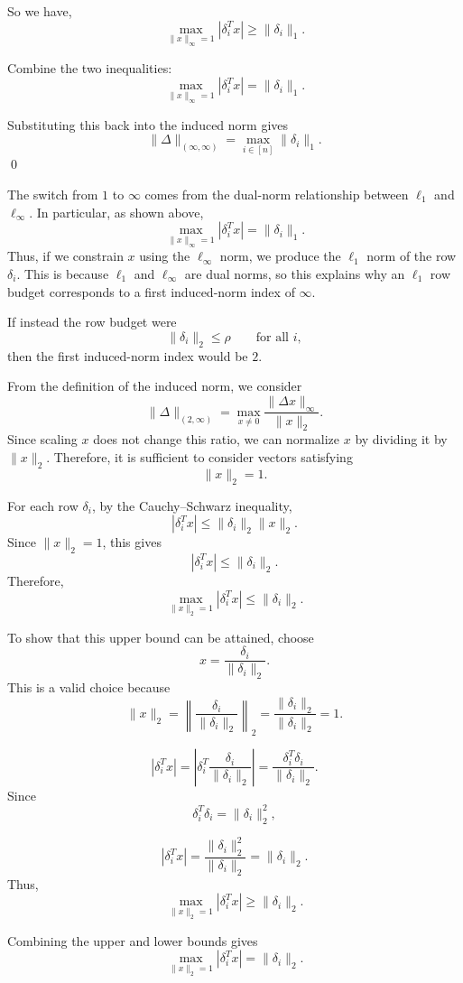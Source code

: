 \documentclass{article}
\begin{document}
So we have, 
\[
\max_{\|x\|_\infty=1}|\delta_i^T x|
\geq
\|\delta_i\|_1.
\]

Combine the two inequalities: 
\[
\max_{\|x\|_\infty=1}|\delta_i^T x|
=
\|\delta_i\|_1.
\]

Substituting this back into the induced norm gives
\[
\|\Delta\|_{(\infty,\infty)}
=
\max_{i\in[n]}\|\delta_i\|_1.
\] \qed

\vspace{5mm}

The switch from $1$ to $\infty$ comes from the dual-norm relationship
between $\ell_1$ and $\ell_\infty$. In particular, as shown above,
\[
\max_{\|x\|_\infty=1} |\delta_i^T x|
=
\|\delta_i\|_1.
\]
Thus, if we constrain $x$ using the $\ell_\infty$ norm, we produce the
$\ell_1$ norm of the row $\delta_i$. This is because $\ell_1$ and
$\ell_\infty$ are dual norms, so this explains why an $\ell_1$ row budget
corresponds to a first induced-norm index of $\infty$.

\vspace{5mm}
If instead the row budget were
\[
\|\delta_i\|_2 \leq \rho
\qquad \text{for all } i,
\]
then the first induced-norm index would be $2$.

From the definition of the induced norm, we consider
\[
\|\Delta\|_{(2,\infty)}
=
\max_{x\neq 0}
\frac{\|\Delta x\|_\infty}{\|x\|_2}.
\]
Since scaling $x$ does not change this ratio, we can normalize $x$ by
dividing it by $\|x\|_2$. Therefore, it is sufficient to consider
vectors satisfying
\[
\|x\|_2=1.
\]

For each row $\delta_i$, by the Cauchy--Schwarz inequality,
\[
|\delta_i^T x|
\leq
\|\delta_i\|_2\|x\|_2.
\]
Since $\|x\|_2=1$, this gives
\[
|\delta_i^T x|
\leq
\|\delta_i\|_2.
\]
Therefore,
\[
\max_{\|x\|_2=1}|\delta_i^T x|
\leq
\|\delta_i\|_2.
\]

To show that this upper bound can be attained, choose
\[
x=\frac{\delta_i}{\|\delta_i\|_2}.
\]
This is a valid choice because
\[
\|x\|_2
=
\left\|
\frac{\delta_i}{\|\delta_i\|_2}
\right\|_2
=
\frac{\|\delta_i\|_2}{\|\delta_i\|_2}
=
1.
\]


\[
|\delta_i^T x|
=
\left|
\delta_i^T
\frac{\delta_i}{\|\delta_i\|_2}
\right|
=
\frac{\delta_i^T\delta_i}{\|\delta_i\|_2}.
\]
Since
\[
\delta_i^T\delta_i=\|\delta_i\|_2^2,
\]


\[
|\delta_i^T x|
=
\frac{\|\delta_i\|_2^2}{\|\delta_i\|_2}
=
\|\delta_i\|_2.
\]
Thus,
\[
\max_{\|x\|_2=1}|\delta_i^T x|
\geq
\|\delta_i\|_2.
\]

Combining the upper and lower bounds gives
\[
\max_{\|x\|_2=1}|\delta_i^T x|
=
\|\delta_i\|_2.
\]
\end{document}
